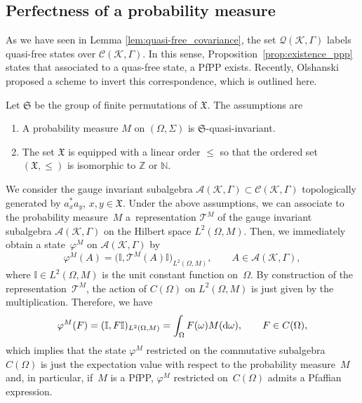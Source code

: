 \documentclass[pdftex]{sigma}
\numberwithin{equation}{section}
\newcommand{\mfrak}[1]{\mathfrak{#1}}
\newcommand{\mcal}[1]{\mathcal{#1}}
\newcommand{\mbb}[1]{\mathbb{#1}}
\begin{document}
\subsection{Perfectness of a probability measure}
As we have seen in Lemma \ref{lem:quasi-free_covariance}, the set $\mcal{Q}(\mcal{K},\Gamma)$ labels quasi-free states over $\mcal{C}(\mcal{K},\Gamma)$. In this sense, Proposition~\ref{prop:existence_ppp} states that associated to a quas-free state, a PfPP exists.
Recently, Olshanski \cite{Olshanski2020} proposed a scheme to invert this correspondence, which is outlined here.

Let $\mfrak{S}$ be the group of finite permutations of $\mfrak{X}$.
The assumptions are
\begin{enumerate}\itemsep=0pt
\item 	A probability measure $M$ on $(\Omega,\Sigma)$ is $\mfrak{S}$-quasi-invariant.
\item 	The set $\mfrak{X}$ is equipped with a linear order $\le$ so that the ordered set $(\mfrak{X},\le)$ is isomorphic to $\mbb{Z}$ or $\mbb{N}$.
\end{enumerate}
We consider the gauge invariant subalgebra $\mcal{A}(\mcal{K},\Gamma)\subset \mcal{C}(\mcal{K},\Gamma)$ topologically generated by $a_{x}^{\ast}a_{y}$, $x,y\in\mfrak{X}$.
Under the above assumptions, we can associate to the probability measure~$M$ a~representation $\mcal{T}^{M}$ of the gauge invariant subalgebra $\mcal{A}(\mcal{K},\Gamma)$ on the Hilbert space $L^{2}(\Omega, M)$. Then, we immediately obtain a state~$\varphi^{M}$ on $\mcal{A}(\mcal{K},\Gamma)$ by
\begin{equation*}
	\varphi^{M}(A)=\big(\mbb{I},\mcal{T}^{M}(A)\mbb{I}\big)_{L^{2}(\Omega,M)},\qquad A\in \mcal{A}(\mcal{K},\Gamma),
\end{equation*}
where $\mbb{I}\in L^{2}(\Omega,M)$ is the unit constant function on~$\Omega$.
By construction of the representa\-tion~$\mcal{T}^{M}$, the action of $C(\Omega)$ on $L^{2}(\Omega,M)$ is just given by the multiplication. Therefore, we have
\begin{equation*}
	\varphi^{M}(F)= (\mbb{I},F\mbb{I} )_{L^{2}(\Omega,M)}=\int_{\Omega}F(\omega)M({\rm d}\omega),\qquad F \in C(\Omega),
\end{equation*}
which implies that the state $\varphi^{M}$ restricted on the commutative subalgebra $C(\Omega)$ is just the expectation value with respect to the probability measure~$M$ and, in particular, if~$M$ is a PfPP, $\varphi^{M}$ restricted on~$C(\Omega)$ admits a Pfaffian expression.
\end{document}
